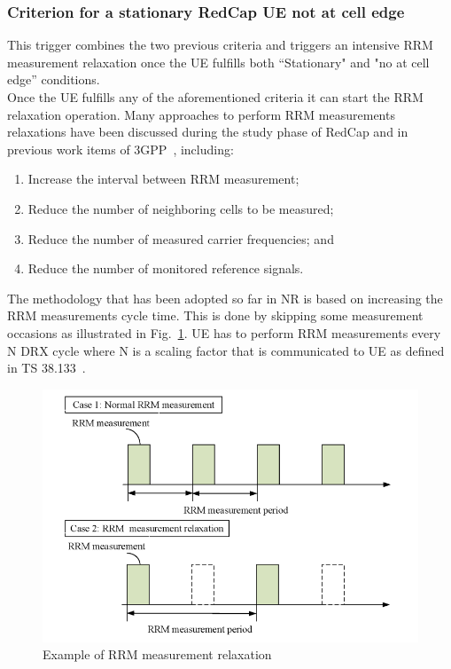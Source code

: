 \documentclass[]{IEEEtran}
\begin{document}
\subsubsection*{\textbf{Criterion for a stationary RedCap UE not at cell edge}} This trigger combines the two previous criteria and triggers an intensive RRM measurement relaxation once the UE fulfills both ``Stationary" and "no at cell edge'' conditions. \\


Once the UE fulfills any of the aforementioned criteria it can start the RRM relaxation operation. Many approaches to perform RRM measurements relaxations have been discussed during the study phase of RedCap and in previous work items of 3GPP~\cite{3gpp_ue_2019_R2-1912335,3gpp_rrm_2019_R2-1912334,1912531_R2-1912531}, including:
\begin{enumerate}
    \item Increase the interval between RRM measurement;
    \item Reduce the number of neighboring cells to be measured;
    \item Reduce the number of measured carrier frequencies; and
    \item Reduce the number of monitored reference signals.
\end{enumerate}
The methodology that has been adopted so far in NR is based on increasing the RRM measurements cycle time. This is done by skipping some measurement occasions as illustrated in Fig.~\ref{fig:rrm-relaxation}. UE has to perform RRM measurements every N DRX cycle where N is a scaling factor that is communicated to UE as defined in TS 38.133~\cite{3gpp_nr_2022-11_38.133}.

\begin{figure}
    \centering
    \includegraphics[width=\linewidth]{Pictures/RRM measurement relaxation.png}
    \caption{Example of RRM measurement relaxation}
    \label{fig:rrm-relaxation}
\end{figure}
\end{document}
